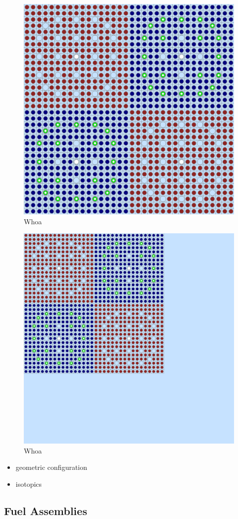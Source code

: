 \begin{figure}[h!]
  \centering
  \includegraphics[width=0.65\linewidth]{figures/benchmarks/2x2}
\caption[A 2$\times$2 colorset of BEAVRS assemblies]{Whoa}
\label{fig:chap7-2x2}
\end{figure}

\begin{figure}[h!]
  \centering
  \includegraphics[width=0.65\linewidth]{figures/benchmarks/reflector}
\caption[A reflected 2$\times$2 colorset of BEAVRS assemblies]{Whoa}
\label{fig:chap7-reflector}
\end{figure}

\begin{itemize}[noitemsep]
  \item geometric configuration
  \item isotopics
\end{itemize}

\subsection{Fuel Assemblies}

